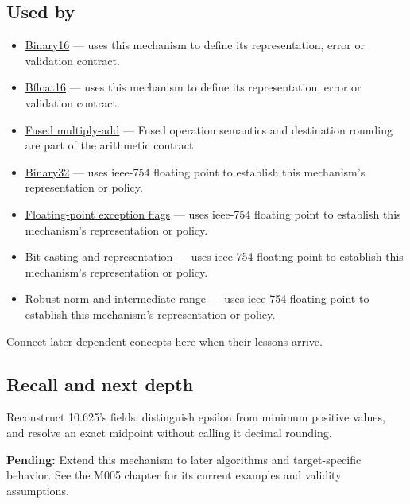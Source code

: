 \subsection{Used by}\label{appendix-343615f49ddf-used-by}

\hypertarget{appendix-343615f49ddf-used-by}{}

\begin{itemize}
\item
  \hyperref[appendix-34443cec7170]{Binary16} --- uses this mechanism to define its representation, error or validation contract.
\item
  \hyperref[appendix-18b8dd966b5d]{Bfloat16} --- uses this mechanism to define its representation, error or validation contract.
\item
  \hyperref[appendix-41e8ef22a21e]{Fused multiply-add} --- Fused operation semantics and destination rounding are part of the arithmetic contract.
\item
  \hyperref[appendix-5057f9ad327f]{Binary32} --- uses ieee-754 floating point to establish this mechanism's representation or policy.
\item
  \hyperref[appendix-ed8531b46754]{Floating-point exception flags} --- uses ieee-754 floating point to establish this mechanism's representation or policy.
\item
  \hyperref[appendix-34ee45f161c1]{Bit casting and representation} --- uses ieee-754 floating point to establish this mechanism's representation or policy.
\item
  \hyperref[appendix-7f1e17dcafb1]{Robust norm and intermediate range} --- uses ieee-754 floating point to establish this mechanism's representation or policy.
\end{itemize}

Connect later dependent concepts here when their lessons arrive.

\subsection{Recall and next depth}\label{appendix-343615f49ddf-recall-and-next-depth}

\hypertarget{appendix-343615f49ddf-recall-and-next-depth}{}

Reconstruct 10.625's fields, distinguish epsilon from minimum positive values, and resolve an exact midpoint without calling it decimal rounding.

\textbf{Pending:} Extend this mechanism to later algorithms and target-specific behavior. See the M005 chapter for its current examples and validity assumptions.

